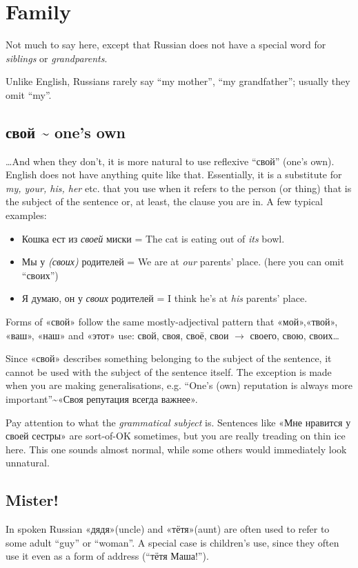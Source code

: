 \chapter{Family}\label{family}

Not much to say here, except that Russian does not have a special word
for \emph{siblings} or \emph{grandparents}.

Unlike English, Russians rarely say ``my mother'', ``my grandfather'';
usually they omit ``my''.

\section{\texorpdfstring{\textbf{свой} \textasciitilde{} one's
own}{свой \textasciitilde{} one's own}}\label{ux441ux432ux43eux439-ones-own}

\ldots{}And when they don't, it is more natural to use reflexive
``свой'' (one's own). English does not have anything quite like that.
Essentially, it is a substitute for \emph{my, your, his, her} etc. that
you use when it refers to the person (or thing) that is the subject of
the sentence or, at least, the clause you are in. A few typical
examples:

\begin{itemize}
\tightlist
\item
  Кошка ест из \emph{своей} миски = The cat is eating out of \emph{its}
  bowl.
\item
  Мы у \emph{(своих)} родителей = We are at \emph{our} parents' place.
  (here you can omit ``своих'')
\item
  Я думаю, он у \emph{своих} родителей = I think he's at \emph{his}
  parents' place.
\end{itemize}

Forms of «свой» follow the same mostly-adjectival pattern that
«мой»,«твой», «ваш», «наш» and «этот» use: свой, своя, своё, свои $ \rightarrow$
своего, свою, своих\ldots{}

Since «свой» describes something belonging to the subject of the
sentence, it cannot be used with the subject of the sentence itself. The
exception is made when you are making generalisations, e.g. ``One's
(own) reputation is always more important''\textasciitilde{}«Своя
репутация всегда важнее».

Pay attention to what the \emph{grammatical subject} is. Sentences like
«Мне нравится у своей сестры» are sort-of-OK sometimes, but you are
really treading on thin ice here. This one sounds almost normal, while
some others would immediately look unnatural.

\section{Mister!}\label{mister}

In spoken Russian «дядя»(uncle) and «тётя»(aunt) are often used to refer
to some adult ``guy'' or ``woman''. A special case is children's use,
since they often use it even as a form of address (``тётя Маша!'').
